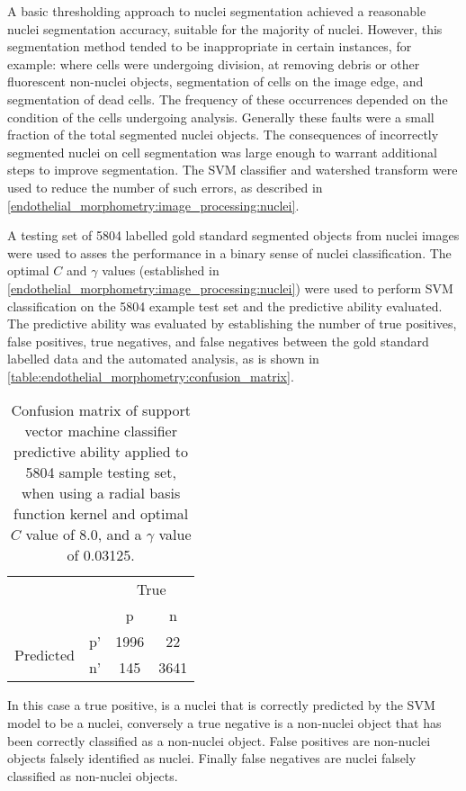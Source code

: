 A basic thresholding approach to nuclei segmentation achieved a reasonable nuclei segmentation accuracy, suitable for the majority of nuclei. However, this segmentation method tended to be inappropriate in certain instances, for example: where cells were undergoing division, at removing debris or other fluorescent non-nuclei objects, segmentation of cells on the image edge, and segmentation of dead cells. The frequency of these occurrences depended on the condition of the cells undergoing analysis. Generally these faults were a small fraction of the total segmented nuclei objects. The consequences of incorrectly segmented nuclei on cell segmentation was large enough to warrant additional steps to improve segmentation. The SVM classifier and watershed transform were used to reduce the number of such errors, as described in \autoref{endothelial_morphometry:image_processing:nuclei}.

A testing set of 5804 labelled gold standard segmented objects from nuclei images were used to asses the performance in a binary sense of nuclei classification. The optimal $C$ and $\gamma$ values (established in \autoref{endothelial_morphometry:image_processing:nuclei}) were used to perform SVM classification on the 5804 example test set and the predictive ability evaluated. The predictive ability was evaluated by establishing the number of true positives, false positives, true negatives, and false negatives between the gold standard labelled data and the automated analysis, as is shown in \autoref{table:endothelial_morphometry:confusion_matrix}.

\begin{table}[htbp]
\caption[Confusion matrix of support vector machine nuclei predictive ability]{Confusion matrix of support vector machine classifier predictive ability applied to 5804 sample testing set, when using a radial basis function kernel and optimal $C$ value of 8.0, and a $\gamma$ value of 0.03125. }
\label{table:endothelial_morphometry:confusion_matrix}
\centering
\begin{tabular}{cc|cc}
	\multicolumn{2}{c}{}&\multicolumn{2}{c}{True}\\
	\multicolumn{2}{c|}{}& p & n\\
	\cline{2-4}
	\multirow{2}{*}{Predicted}& p' & 1996 & 22\\ & n' & 145 & 3641\\
\end{tabular}
\end{table}

In this case a true positive, is a nuclei that is correctly predicted by the SVM model to be a nuclei, conversely a true negative is a non-nuclei object that has been correctly classified as a non-nuclei object. False positives are non-nuclei objects falsely identified as nuclei. Finally false negatives are nuclei falsely classified as non-nuclei objects.

